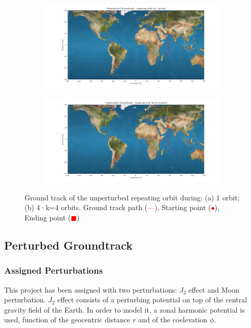 \documentclass{article}
\newcommand{\reddashedline}{\textcolor{red}{---}}
\begin{document}
\begin{figure}[ht]
	\centering
	\begin{subfigure}[b]{0.45\textwidth}
		\includegraphics[width=\textwidth]{ugro1orb.png}
		\caption{}
		\label{fig:1a}
	\end{subfigure}
	\hfill
	\begin{subfigure}[b]{0.45\textwidth}
		\includegraphics[width=\textwidth]{ugro4orb.png}
		\caption{}
		\label{fig:1b}
	\end{subfigure}
	
	\caption{Ground track of the unperturbed repeating orbit during: (a) 1 orbit; (b) 4·k=4 orbits. Ground track path (\reddashedline), Starting point (\textcolor{red}{$\bullet$}), Ending point (\textcolor{red}{$\blacksquare$})
	}
\end{figure}

\subsection{Perturbed Groundtrack}
\subsubsection{Assigned Perturbations}

This project has been assigned with two perturbations: \( J_2 \) effect and Moon perturbation. \( J_2 \) effect consists of a perturbing potential on top of the central gravity field of the Earth. In order to model it, a zonal harmonic potential is used, function of the geocentric distance \( r \) and of the coelevation \( \phi \).
\end{document}
